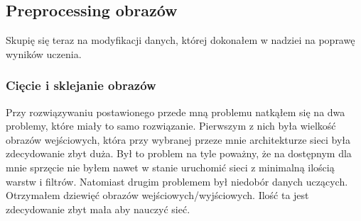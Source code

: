 \documentclass{article}
\begin{document}
\subsection{Preprocessing obrazów}
Skupię się teraz na modyfikacji danych, której dokonałem w nadziei na poprawę wyników uczenia.
\subsubsection{Cięcie i sklejanie obrazów}
Przy rozwiązywaniu postawionego przede mną problemu natkąłem się na dwa problemy, które miały to samo rozwiązanie.
Pierwszym z nich była wielkość obrazów wejściowych, która przy wybranej przeze mnie architekturze sieci była zdecydowanie zbyt duża. Był to problem na tyle poważny, że na dostępnym dla mnie sprzęcie nie byłem nawet w stanie uruchomić sieci z minimalną ilością warstw i filtrów.
Natomiast drugim problemem był niedobór danych uczących.
Otrzymałem dziewięć obrazów wejściowych/wyjściowych.
Ilość ta jest zdecydowanie zbyt mała aby nauczyć sieć.
\end{document}
